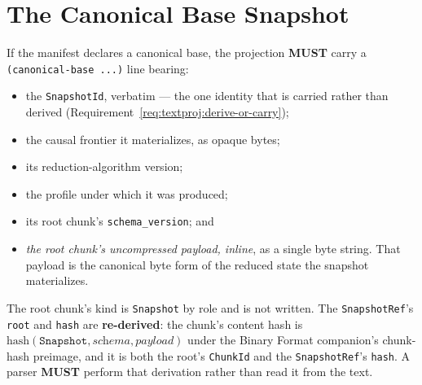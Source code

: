 \documentclass[11pt,letterpaper]{report}
\newcounter{requirement}[chapter]
\newcommand{\MUST}{\textbf{MUST}}
\begin{document}
\section{The Canonical Base Snapshot}

\begin{requirement}
  \label{req:textproj:base-snapshot-inline}
  If the manifest declares a canonical base, the projection \MUST{} carry a
  \texttt{(canonical-base ...)} line bearing:

  \begin{itemize}
    \item the \texttt{SnapshotId}, verbatim --- the one identity that is carried
      rather than derived (Requirement~\ref{req:textproj:derive-or-carry});
    \item the causal frontier it materializes, as opaque bytes;
    \item its reduction-algorithm version;
    \item the profile under which it was produced;
    \item its root chunk's \texttt{schema\_version}; and
    \item \emph{the root chunk's uncompressed payload, inline}, as a single byte
      string. That payload is the canonical byte form of the reduced state the
      snapshot materializes.
  \end{itemize}

  The root chunk's kind is \texttt{Snapshot} by role and is not written. The
  \texttt{SnapshotRef}'s \texttt{root} and \texttt{hash} are \textbf{re-derived}:
  the chunk's content hash is
  $\textrm{hash}(\texttt{Snapshot}, \textit{schema}, \textit{payload})$ under the
  Binary Format companion's chunk-hash preimage, and it is both the root's
  \texttt{ChunkId} and the \texttt{SnapshotRef}'s \texttt{hash}. A parser
  \MUST{} perform that derivation rather than read it from the text.
\end{requirement}
\end{document}
